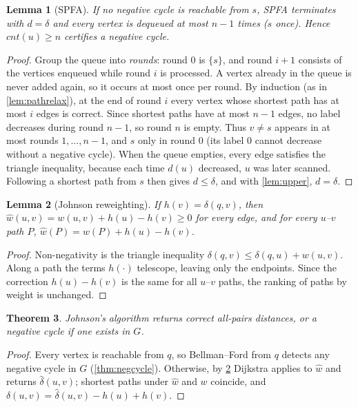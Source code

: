 \documentclass[11pt,a4paper]{article}
\newtheorem{theorem}{Theorem}
\newtheorem{lemma}[theorem]{Lemma}
\theoremstyle{definition}
\newcommand{\dd}{\mathit{d}}
\begin{document}
\begin{lemma}[SPFA]\label{lem:spfa}
If no negative cycle is reachable from $s$, SPFA terminates with $\dd=\delta$ and every vertex is dequeued at most $n-1$ times ($s$ once). Hence $\mathit{cnt}(u)\ge n$ certifies a negative cycle.
\end{lemma}
\begin{proof}
Group the queue into \emph{rounds}: round $0$ is $\{s\}$, and round $i+1$ consists of the vertices enqueued while round $i$ is processed. A vertex already in the queue is never added again, so it occurs at most once per round. By induction (as in \cref{lem:pathrelax}), at the end of round $i$ every vertex whose shortest path has at most $i$ edges is correct. Since shortest paths have at most $n-1$ edges, no label decreases during round $n-1$, so round $n$ is empty. Thus $v\neq s$ appears in at most rounds $1,\dots,n-1$, and $s$ only in round $0$ (its label $0$ cannot decrease without a negative cycle). When the queue empties, every edge satisfies the triangle inequality, because each time $\dd(u)$ decreased, $u$ was later scanned. Following a shortest path from $s$ then gives $\dd\le\delta$, and with \cref{lem:upper}, $\dd=\delta$.
\end{proof}

\begin{lemma}[Johnson reweighting]\label{lem:johnson}
If $h(v)=\delta(q,v)$, then $\hat w(u,v)=w(u,v)+h(u)-h(v)\ge 0$ for every edge, and for every $u$--$v$ path $P$, $\hat w(P)=w(P)+h(u)-h(v)$.
\end{lemma}
\begin{proof}
Non-negativity is the triangle inequality $\delta(q,v)\le\delta(q,u)+w(u,v)$. Along a path the terms $h(\cdot)$ telescope, leaving only the endpoints. Since the correction $h(u)-h(v)$ is the same for all $u$--$v$ paths, the ranking of paths by weight is unchanged.
\end{proof}

\begin{theorem}
Johnson's algorithm returns correct all-pairs distances, or a negative cycle if one exists in $G$.
\end{theorem}
\begin{proof}
Every vertex is reachable from $q$, so Bellman--Ford from $q$ detects any negative cycle in $G$ (\cref{thm:negcycle}). Otherwise, by \cref{lem:johnson} Dijkstra applies to $\hat w$ and returns $\hat\delta(u,v)$; shortest paths under $\hat w$ and $w$ coincide, and $\delta(u,v)=\hat\delta(u,v)-h(u)+h(v)$.
\end{proof}
\end{document}
